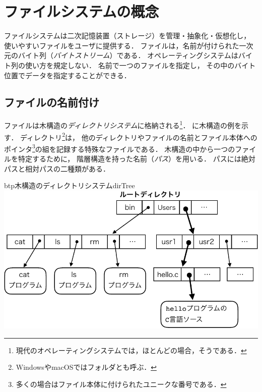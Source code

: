 \chapter{ファイルシステムの概念}
\label{fileSystemConcepts}
ファイルシステムは二次記憶装置（ストレージ）を管理・抽象化・仮想化し，
使いやすいファイルをユーザに提供する．
ファイルは，名前が付けられた一次元のバイト列（\emph{バイトストリーム}）である．
オペレーティングシステムはバイト列の使い方を規定しない．
名前で一つのファイルを指定し，
その中のバイト位置でデータを指定することができる．

\section{ファイルの名前付け}
ファイルは木構造の\emph{ディレクトリシステム}に格納される\footnote{
  現代のオペレーティングシステムでは，ほとんどの場合，そうである．}．
に木構造の例を示す．
ディレクトリ\footnote{WindowsやmacOSではフォルダとも呼ぶ．}は，
他のディレクトリやファイルの名前とファイル本体へのポインタ\footnote{
  多くの場合はファイル本体に付けられたユニークな番号である．
}の組を記録する特殊なファイルである．
木構造の中から一つのファイルを特定するために，
階層構造を持った名前（\emph{パス}）を用いる．
パスには絶対パスと相対パスの二種類がある．

\begin{myfig}{btp}{木構造のディレクトリシステム}{dirTree}
  \includegraphics[scale=.8]{Fig/dirTree-crop.pdf}
\end{myfig}

